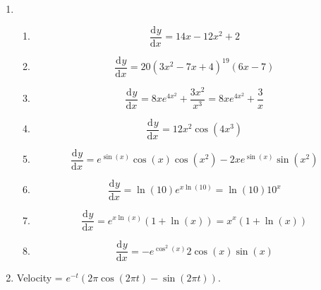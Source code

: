 \documentclass{article}
\newcommand{\deriv}[3][]{\frac{\mathrm{d}^{#1} #2}{\mathrm{d}#3^{#1}}}
\begin{document}
\begin{enumerate}
	\item 
		\begin{enumerate}
			\item
				\[\deriv{y}{x}=14x-12x^2+2\]
			\item
				\[\deriv{y}{x}=20(3x^2-7x+4)^{19}(6x-7)\]
			\item
				\[\deriv{y}{x}=8xe^{4x^2}+\frac{3x^2}{x^3}=8xe^{4x^2}+\frac{3}{x}\]
			\item
				\[\deriv{y}{x} = 12x^2\cos(4x^3)\]
			\item
				\[\deriv{y}{x} = e^{\sin(x)}\cos(x)\cos(x^2) - 2xe^{\sin(x)}\sin(x^2)\]
			\item
				\[\deriv{y}{x} = \ln(10)e^{x\ln(10)}=\ln(10)10^x\]
			\item
				\[\deriv{y}{x} = e^{x\ln(x)}\left(1+\ln(x)\right) = x^x\left(1+\ln(x)\right)\]
			\item
				\[\deriv{y}{x} = -e^{\cos^2(x)}2\cos(x)\sin(x)\]
		\end{enumerate}
	\item Velocity = $e^{-t}\left(2\pi\cos(2\pi t)-\sin(2\pi t)\right)$.
	

\end{enumerate}
\end{document}
